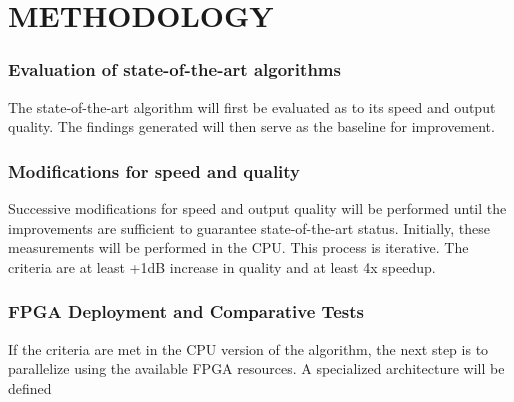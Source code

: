 
\chapter{METHODOLOGY} %

\label{Chapter4} %



\subsection{Evaluation of state-of-the-art algorithms}
The state-of-the-art algorithm will first be evaluated as to its speed and output quality.
The findings generated will then serve as the baseline for improvement.


\subsection{Modifications for speed and quality}
Successive modifications for speed and output quality will be performed until the improvements are sufficient to guarantee state-of-the-art status.
Initially, these measurements will be performed in the CPU.
This process is iterative.
The criteria are at least +1dB increase in quality and at least 4x speedup.


\subsection{FPGA Deployment and Comparative Tests}
If the criteria are met in the CPU version of the algorithm, the next step is to parallelize using the available FPGA resources.
A specialized  architecture will be defined

